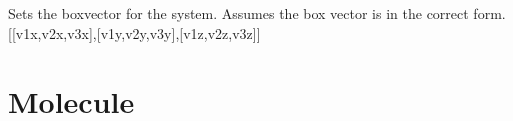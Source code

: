 \documentclass[letterpaper,10pt,english]{sphinxmanual}
\begin{document}
\begin{fulllineitems}
\begin{fulllineitems}
\begin{description}
\end{description}

\end{fulllineitems}



\begin{fulllineitems}
\label{system:ctools.System.System.setBoxVector}
Sets the boxvector for the system. Assumes the box vector is in the correct form. {[}{[}v1x,v2x,v3x{]},{[}v1y,v2y,v3y{]},{[}v1z,v2z,v3z{]}{]}

\end{fulllineitems}


\end{fulllineitems}



\chapter{Molecule}
\label{molecule:molecule}\label{molecule::doc}\label{molecule:module-ctools.Molecule}
\end{document}
